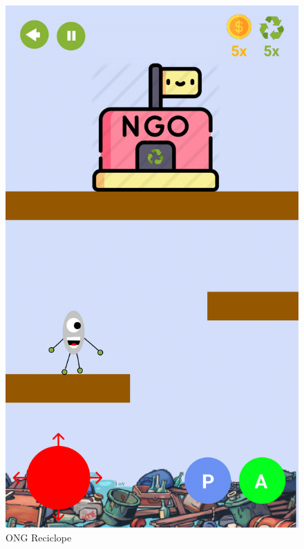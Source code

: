 \documentclass[]{scrartcl}
\begin{document}
\begin{figure}[H]
	\begin{center}
		\includegraphics[scale=0.3]{figs/Game Design-20.png}
		\caption{ONG Reciclope}
	\end{center}
\end{figure}
\end{document}
